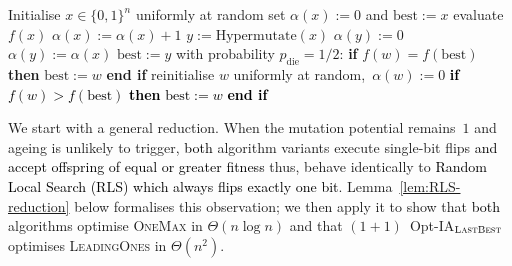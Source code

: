 \documentclass[lettersize,journal]{IEEEtran}
\newcommand{\new}[1]{\textcolor{black}{#1}}
\newcommand{\rev}[1]{\textcolor{black}{#1}}
\newcommand{\rerev}[1]{\textcolor{black}{#1}}
\newcommand{\lastBest}{$(1+1)$~Opt-IA$_{\textsc{LastBest}}$}
\begin{document}
\begin{algorithm}[t] 
 		\caption{$(1+1)$~Opt-IA$_{\textsc{FirstBest}}$ }
 		\begin{algorithmic}[1] \STATE Initialise $x \in\{0,1\}^n$ uniformly at random \STATE set $\alpha(x):=0$ and $\text{best}:=x$      
 			\STATE evaluate $f(x)$    
 			 \STATE $\alpha(x):=\alpha(x)+1$
 			\STATE $y:=\text{Hypermutate}(x)$
 			\STATE $\alpha(y):=0$
 			\ELSE
 			\STATE $\alpha(y):=\alpha(x)$
 			\ENDIF
 			\STATE $\text{best}:=y$
 			\ENDIF
 			\STATE with probability $p_{\text{die}}=1/2$:
 			\STATE \hspace{\algorithmicindent}
 			\textbf{if} $f(w) = f(\text{best})$ \textbf{then}
 			\STATE \hspace{2\algorithmicindent}
 			$\text{best}:=w$
 			\STATE \hspace{\algorithmicindent}
 			\textbf{end if}
 			\STATE \hspace{\algorithmicindent}
 			reinitialise $w$ uniformly at random,\ $\alpha(w):=0$
 			\textcolor{black}{\STATE \hspace{\algorithmicindent}
 				\textbf{if} $f(w) > f(\text{best})$ \textbf{then}
 				\STATE \hspace{2\algorithmicindent}
 				$\text{best}:=w$
 				\STATE \hspace{\algorithmicindent}
 				\textbf{end if}}
 			\ENDIF
 			\ENDFOR
\rev{ 
\ENDIF}
 			\ENDWHILE
 		\end{algorithmic} 
 		\label{alg:alg2+ageing}
 	\end{algorithm}












We start with a general reduction.  When the mutation potential remains~$1$
and ageing is unlikely to trigger, \new{both} algorithm variants execute
single-bit flips \rerev{and accept offspring of equal or greater fitness} thus, behave identically to \rerev{Random Local Search (RLS) which always flips exactly one bit}.
Lemma~\ref{lem:RLS-reduction} below formalises this observation;
we then apply it to show that \new{both} algorithms optimise
\textsc{OneMax} in $\Theta(n\log n)$ and that \lastBest{} optimises
\textsc{LeadingOnes} in $\Theta(n^2)$.
\end{document}
